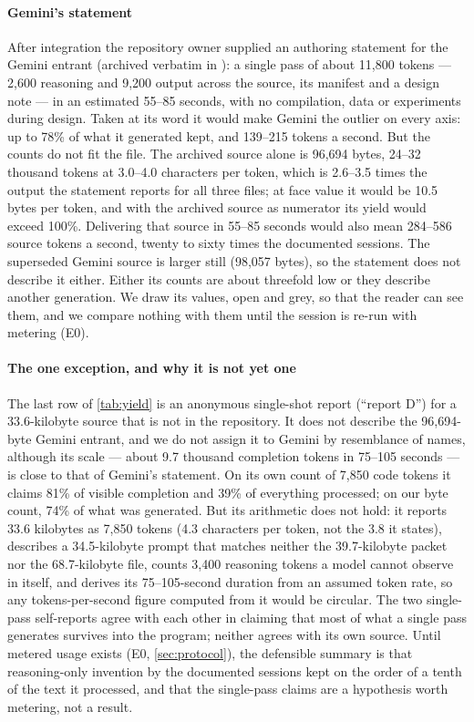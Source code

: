 \paragraph{Gemini's statement} After integration the repository owner supplied an authoring statement
for the Gemini entrant (archived verbatim in ):
a single  pass of about 11,800 tokens --- 2,600 reasoning and 9,200 output
across the source, its manifest and a design note --- in an estimated 55--85 seconds, with no
compilation, data or experiments during design. Taken at its word it would make Gemini the outlier
on every axis: up to 78\% of what it generated kept, and 139--215 tokens a second. But the counts do
not fit the file. The archived source alone is 96,694 bytes, 24--32 thousand tokens at 3.0--4.0
characters per token, which is 2.6--3.5 times the output the statement reports for all three files;
at face value it would be 10.5 bytes per token, and with the archived source as numerator its yield
would exceed 100\%. Delivering that source in 55--85 seconds would also mean 284--586 source tokens a
second, twenty to sixty times the documented sessions. The superseded Gemini source is larger still
(98,057 bytes), so the statement does not describe it either. Either its counts are about threefold
low or they describe another generation. We draw its values, open and grey, so that the reader can
see them, and we compare nothing with them until the session is re-run with metering (E0).

\paragraph{The one exception, and why it is not yet one} The last row of \cref{tab:yield} is an
anonymous single-shot report (``report D'') for a 33.6-kilobyte source that is not in the
repository. It does not describe the 96,694-byte Gemini entrant, and we do not assign it to Gemini by
resemblance of names, although its scale --- about 9.7 thousand completion tokens in 75--105 seconds
--- is close to that of Gemini's statement. On its own count of 7,850 code tokens it claims 81\% of visible completion and
39\% of everything processed; on our byte count, 74\% of what was generated. But its arithmetic does
not hold: it reports 33.6 kilobytes as 7,850 tokens (4.3 characters per token, not the 3.8 it states),
describes a 34.5-kilobyte prompt that matches neither the 39.7-kilobyte packet nor the 68.7-kilobyte file,
counts 3,400 reasoning tokens a model cannot observe in itself, and derives its 75--105-second
duration from an assumed token rate, so any tokens-per-second figure computed from it would be
circular. The two single-pass self-reports agree with each other in claiming that most of what a
single pass generates survives into the program; neither agrees with its own source. Until metered
usage exists (E0, \cref{sec:protocol}), the defensible summary is that reasoning-only invention by
the documented sessions kept on the order of a tenth of the text it processed, and that the
single-pass claims are a hypothesis worth metering, not a result.

